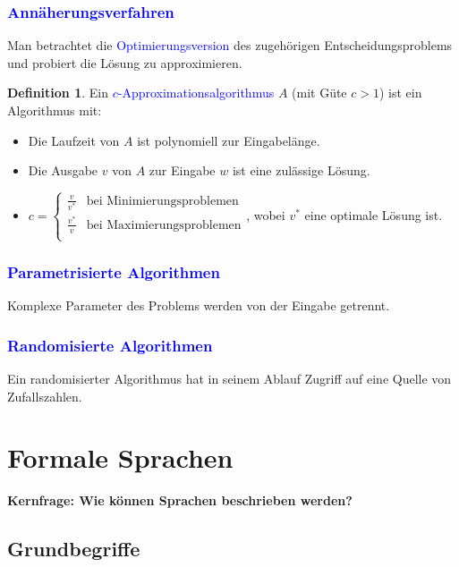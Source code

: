 \documentclass{scrreprt}
\theoremstyle{definition}
\newtheorem{Definition}{Definition}[section]
\theoremstyle{example}
\theoremstyle{algorithm}
\begin{document}
\subsection{\textcolor{blue}{Annäherungsverfahren}}
Man betrachtet die \textcolor{blue}{Optimierungsversion} des zugehörigen Entscheidungsproblems und probiert die Lösung zu approximieren.
\begin{Definition}
Ein \textcolor{blue}{$c$-Approximationsalgorithmus} $A$ (mit Güte $c > 1$) ist ein Algorithmus mit:
\begin{itemize}
\item
Die Laufzeit von $A$ ist polynomiell zur Eingabelänge.
\item
Die Ausgabe $v$ von $A$ zur Eingabe $w$ ist eine zulässige Lösung.
\item
$c=
\begin{cases}
\frac{v}{v^*}& \text{bei Minimierungsproblemen}\\
\frac{v^*}{v}& \text{bei Maximierungsproblemen}\\
\end{cases}$, wobei $v^*$ eine optimale Lösung ist.
\end{itemize}
\end{Definition}
\subsection{\textcolor{blue}{Parametrisierte Algorithmen}}
Komplexe Parameter des Problems werden von der Eingabe getrennt.

\subsection{\textcolor{blue}{Randomisierte Algorithmen}}
Ein randomisierter Algorithmus hat in seinem Ablauf Zugriff auf eine Quelle von Zufallszahlen.
\chapter{Formale Sprachen}
\textbf{Kernfrage: Wie können Sprachen beschrieben werden?}

\section{Grundbegriffe}
\end{document}
